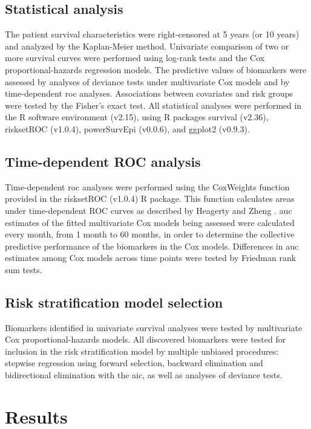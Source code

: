 \subsection{Statistical analysis}

The patient survival characteristics were right-censored at 5 years (or 10 years) and analyzed by the Kaplan-Meier method. Univariate comparison of two or more survival curves were performed using log-rank tests and the Cox proportional-hazards regression models. The predictive values of biomarkers were assessed by analyses of deviance tests under multivariate Cox models and by time-dependent \gls{roc} analyses. Associations between covariates and risk groups were tested by the Fisher's exact test. All statistical analyses were performed in the R software environment (v2.15), using R packages survival (v2.36), risksetROC (v1.0.4), powerSurvEpi (v0.0.6), and ggplot2 (v0.9.3).

\subsection{Time-dependent ROC analysis}

Time-dependent \gls{roc} analyses were performed using the CoxWeights function provided in the risksetROC (v1.0.4) R package. This function calculates areas under time-dependent ROC curves as described by Heagerty and Zheng . \gls{auc} estimates of the fitted multivariate Cox models being assessed were calculated every month, from 1 month to 60 months, in order to determine the collective predictive performance of the biomarkers in the Cox models. Differences in \gls{auc} estimates among Cox models across time points were tested by Friedman rank sum tests.

\subsection{Risk stratification model selection}

Biomarkers identified in univariate survival analyses were tested by multivariate Cox proportional-hazards models. All discovered biomarkers were tested for inclusion in the risk stratification model by multiple unbiased procedures: stepwise regression using forward selection, backward elimination and bidirectional elimination with the \gls{aic}, as well as analyses of deviance tests.


\section{Results}

